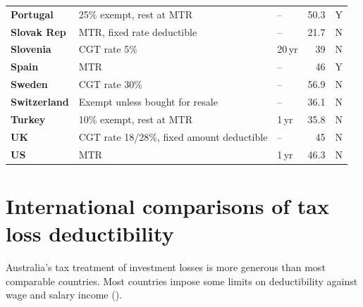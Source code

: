 \begin{subappendices}
\begin{table}
{\begin{tabular}[t]{>{\footnotesize}l>{\raggedleft\footnotesize}p{6.30cm}>{\raggedleft\footnotesize}p{1.20cm}>{\footnotesize}r>{\footnotesize\raggedleft\arraybackslash}p{1.40cm}}
 \textbf{Portugal}    & 25\% exempt, rest at MTR                                                 & --                   & 50.3             & Y \\
 \textbf{Slovak Rep}  & MTR, fixed rate deductible                                                                   & --                   & 21.7             & N \\
 \textbf{Slovenia}    & CGT rate 5\%                                                    & 20\,yr                  & 39               & N \\
 \textbf{Spain}       & MTR                                                                      & --                    & 46               & Y \\
 \textbf{Sweden}      & CGT rate 30\%                                                            & --                    & 56.9             & N \\
 \textbf{Switzerland} & Exempt unless bought for resale                                          & --                    & 36.1             & N \\
 \textbf{Turkey}      & 10\% exempt, rest at MTR                                                 & 1\,yr                   & 35.8             & N \\
 \textbf{UK}          & CGT rate 18/28\%, fixed amount deductible                                & --                    & 45               & N \\
 {\textbf{US}}        & MTR                                         & {1\,yr}                 & {46.3}           & {N} \\
\bottomrule
\end{tabular}}
\end{table}


\chapter{International comparisons of tax loss deductibility\label{appendix:CGT-C}\label{appendix:Intl-comparisons-tax-loss-deductibility}}
Australia’s tax treatment of investment losses is more generous than most comparable countries. Most countries impose some limits on deductibility against wage and salary income ().


\end{subappendices}
